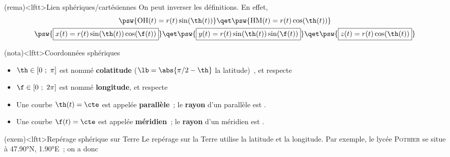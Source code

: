 \documentclass[../../main/main.tex]{subfiles}
\begin{document}
\begin{tcb*}[sidebyside, righthand ratio=.35]
\begin{center}
{		}%
		\vspace{-15pt}
	\end{center}
\end{tcb*}

\begin{tcb}(rema)<lftt>{Lien sphériques/cartésiennes}
	On peut inverser les définitions. En effet,
	\begin{gather*}
		\psw{{\rm OH}(t) = r(t)\sin(\th(t))}
		\qet
		\psw{{\rm HM}(t) = r(t)\cos(\th(t))}
		\\
		\psw{\boxed{x(t) = r(t)\sin(\th(t))\cos(\f(t))}}
		\qet
		\psw{\boxed{y(t) = r(t)\sin(\th(t))\sin(\f(t))}}
		\qet
		\psw{\boxed{z(t) = r(t)\cos(\th(t))}}
	\end{gather*}
\end{tcb}

\begin{tcb}(nota)<lftt>{Coordonnées sphériques}
	\begin{itemize}[itemsep=-5pt]
		\item $\th \in [0~;~\pi]$ est nommé \textbf{colatitude} ($\lb =
		      \abs{\pi/2 - \th}$ la latitude)~, et respecte
		      \psw{%
			      \[
				      \tan(\th(t))
				      = \frac{\rm OH(t)}{z(t)}
				      \Lra \th
				      = \arctan(\frac{\sqrt{x^2(t) + y^2(t)}}{z(t)})
			      \]
		      }%
		      \vspace{-15pt}
		\item $\f \in [0~;~2\pi]$ est nommé \textbf{longitude}, et respecte
		\item Une courbe $\th(t) = \cte$ est appelée \textbf{parallèle}~; le
		      \textbf{rayon} d'un parallèle est .
		\item Une courbe $\f(t) = \cte$ est appelée \textbf{méridien}~; le
		      \textbf{rayon} d'un méridien est .
	\end{itemize}
\end{tcb}

\begin{tcb}(exem)<lftt>{Repérage sphérique sur Terre}
	Le repérage sur la Terre utilise la latitude et la longitude. Par
	exemple, le lycée \textsc{Pothier} se situe à \ang{47.90}N,
	\ang{1.90;;}E~; on a donc
	\psw{%
		\[
			\th\ind{\textsc{Pothier}} = \ang{42.1}
			\qet
			\f\ind{\textsc{Pothier}} = \ang{1.90}
		\]
	}%
	\vspace{-25pt}
\end{tcb}
\end{document}
